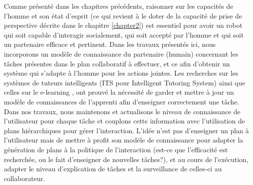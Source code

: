 \documentclass[a4paper,11pt,twoside]{StyleThese}
\begin{document}
Comme présenté dans les chapitres précédents, raisonner sur les capacités de l'homme et son état d'esprit (ce qui revient à le doter de la capacité de prise de perspective décrite dans le chapitre \ref{chapter2}) est essentiel pour avoir un robot qui soit capable d'interagir socialement, qui soit accepté par l'homme et qui soit un partenaire efficace et pertinent.
Dans les travaux présentés ici, nous incorporons un modèle de connaissance du partenaire (humain) concernant les tâches présentes dans le plan collaboratif à effectuer, et ce afin d'obtenir un système qui s'adapte à l'homme pour les actions jointes.
Les recherches sur les systèmes de tuteurs intelligents (ITS pour Intelligent Tutoring System) \cite{brusilovskiy1994construction} ainsi que celles sur le e-learning \cite{brusilovskiy2005}, ont prouvé la nécessité de garder et mettre à jour un modèle de connaissances de l'apprenti afin d'enseigner correctement une tâche.
%
Dans nos travaux, nous maintenons et actualisons le niveau de connaissance de l'utilisateur pour chaque tâche et couplons cette information avec l'utilisation de plans hiérarchiques pour gérer l'interaction. L'idée n'est pas d'enseigner un plan à l'utilisateur mais de mettre à profit son modèle de connaissance pour adapter la génération de plans à la politique de l'interaction (est-ce que l'efficacité est recherchée, ou le fait d'enseigner de nouvelles tâches?), et au cours de l'exécution, adapter le niveau d'explication de tâches et la surveillance de celles-ci au collaborateur.
%
\end{document}
